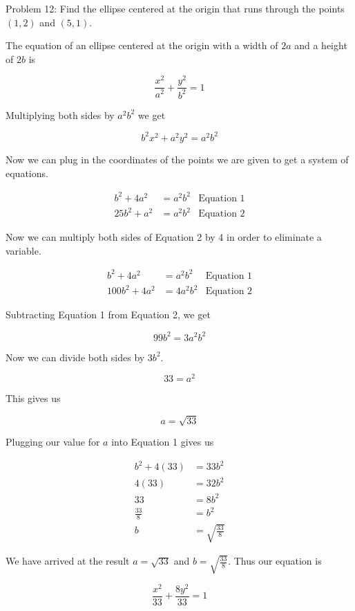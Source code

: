 Problem 12: Find the ellipse centered at the origin that runs through the points $(1, 2)$ and $(5, 1)$.

The equation of an ellipse centered at the origin with a width of $2a$ and a height of $2b$ is

$$\frac{x^2}{a^2} + \frac{y^2}{b^2} = 1$$

Multiplying both sides by $a^2 b^2$ we get

$$b^2 x^2 + a^2 y^2 = a^2 b^2 $$

Now we can plug in the coordinates of the points we are given to get a system of equations.

\begin{align*}
b^2 + 4a^2 &= a^2 b^2 & \text{Equation 1} \\
25 b^2 + a^2 &= a^2 b^2 & \text{Equation 2}
\end{align*}

Now we can multiply both sides of Equation 2 by 4 in order to eliminate a variable.

\begin{align*}
b^2 + 4a^2 &= a^2 b^2 & \text{Equation 1} \\
100 b^2 + 4a^2 &= 4a^2 b^2 & \text{Equation 2}
\end{align*}

Subtracting Equation 1 from Equation 2, we get

$$ 99b^2 = 3a^2b^2 $$

Now we can divide both sides by $3b^2$.

$$ 33 = a^2 $$

This gives us

$$ a = \sqrt{33} $$

Plugging our value for $a$ into Equation 1 gives us

\begin{align*}
b^2 + 4(33) &= 33 b^2 \\
4(33) &= 32b^2 \\
33 &= 8b^2 \\
\frac{33}{8} &= b^2 \\
b &= \sqrt{\frac{33}{8}}
\end{align*}

We have arrived at the result $\displaystyle a = \sqrt{33}$ and $\displaystyle b = \sqrt{\frac{33}{8}}$. Thus our equation is

$$ \boxed{\frac{x^2}{33} + \frac{8y^2}{33} = 1} $$
